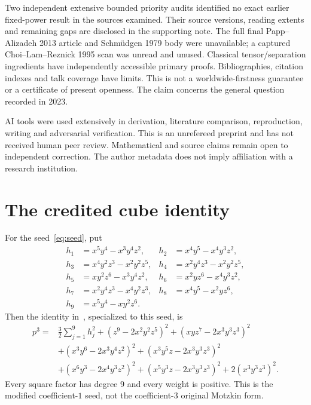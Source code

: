 \documentclass[11pt]{article}
\begin{document}
Two independent extensive bounded priority audits identified no exact
earlier fixed-power result in the sources examined. Their source versions,
reading extents and remaining gaps are disclosed in the supporting note.
The full final Papp--Alizadeh 2013 article and Schm\"udgen 1979 body were
unavailable; a captured Choi--Lam--Reznick 1995 scan was unread and unused.
Classical tensor/separation ingredients have independently accessible
primary proofs. Bibliographies, citation indexes and talk coverage have
limits. This is not a worldwide-firstness guarantee or a certificate of
present openness. The claim concerns the general question recorded in 2023.

AI tools were used extensively in derivation, literature comparison,
reproduction, writing and adversarial verification. This is an unrefereed
preprint and has not received human peer review. Mathematical and source
claims remain open to independent correction. The author metadata does
not imply affiliation with a research institution.

\appendix
\section{The credited cube identity}\label{app:cube}
For the seed~\eqref{eq:seed}, put
\begin{align*}
h_1&=x^5y^4-x^3y^4z^2,& h_2&=x^4y^5-x^4y^3z^2,\\
h_3&=x^4y^2z^3-x^2y^2z^5,&h_4&=x^2y^4z^3-x^2y^2z^5,\\
h_5&=xy^2z^6-x^3y^4z^2,&h_6&=x^2yz^6-x^4y^3z^2,\\
h_7&=x^2y^4z^3-x^4y^2z^3,&h_8&=x^4y^5-x^2yz^6,\\
h_9&=x^5y^4-xy^2z^6.&&
\end{align*}
Then the identity in~\cite{BKR}, specialized to this seed, is
\begin{align*}
p^3={}&\frac32\sum_{j=1}^9h_j^2+(z^9-2x^2y^2z^5)^2
 +(xyz^7-2x^3y^3z^3)^2\\
&+(x^3y^6-2x^3y^4z^2)^2+(x^3y^5z-2x^3y^3z^3)^2\\
&+(x^6y^3-2x^4y^3z^2)^2+(x^5y^3z-2x^3y^3z^3)^2
 +2(x^3y^3z^3)^2.
\end{align*}
Every square factor has degree 9 and every weight is positive.
This is the modified coefficient-$1$ seed, not the coefficient-$3$
original Motzkin form.
\end{document}
